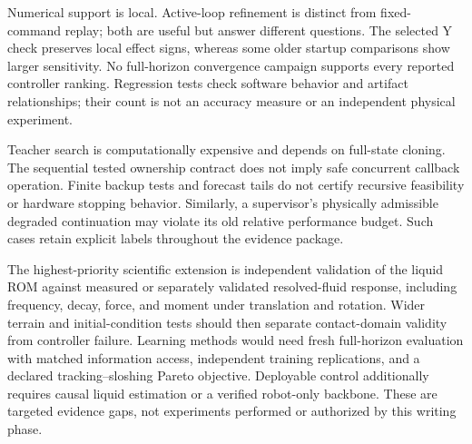 Numerical support is local. Active-loop refinement is distinct from fixed-command replay; both are useful but answer different questions. The selected Y check preserves local effect signs, whereas some older startup comparisons show larger sensitivity. No full-horizon convergence campaign supports every reported controller ranking. Regression tests check software behavior and artifact relationships; their count is not an accuracy measure or an independent physical experiment.

Teacher search is computationally expensive and depends on full-state cloning. The sequential tested ownership contract does not imply safe concurrent callback operation. Finite backup tests and forecast tails do not certify recursive feasibility or hardware stopping behavior. Similarly, a supervisor's physically admissible degraded continuation may violate its old relative performance budget. Such cases retain explicit labels throughout the evidence package.

The highest-priority scientific extension is independent validation of the liquid ROM against measured or separately validated resolved-fluid response, including frequency, decay, force, and moment under translation and rotation. Wider terrain and initial-condition tests should then separate contact-domain validity from controller failure. Learning methods would need fresh full-horizon evaluation with matched information access, independent training replications, and a declared tracking--sloshing Pareto objective. Deployable control additionally requires causal liquid estimation or a verified robot-only backbone. These are targeted evidence gaps, not experiments performed or authorized by this writing phase.

